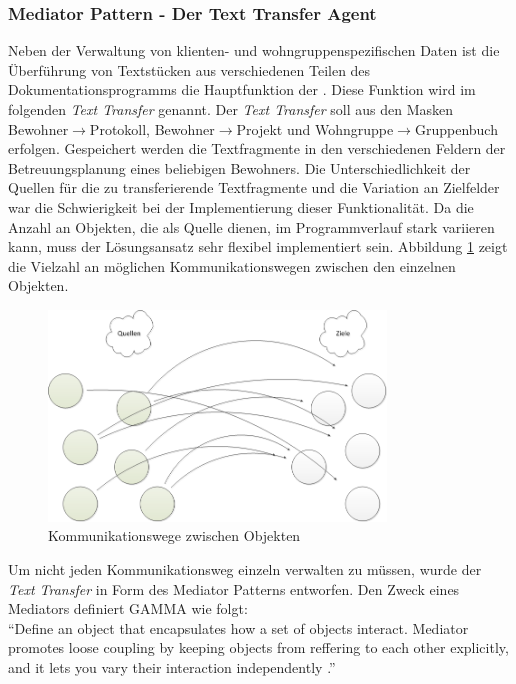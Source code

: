 \subsubsection{Mediator Pattern - Der Text Transfer Agent}
Neben der Verwaltung von klienten- und wohngruppenspezifischen Daten ist die Überführung von Textstücken aus verschiedenen Teilen des
Dokumentationsprogramms die Hauptfunktion der \EBP. Diese Funktion wird im folgenden \textit{Text Transfer} genannt. \newline
Der \textit{Text Transfer} soll aus den Masken Bewohner$\rightarrow$Protokoll, Bewohner$\rightarrow$Projekt und Wohngruppe$\rightarrow$Gruppenbuch
erfolgen. Gespeichert werden die Textfragmente in den verschiedenen Feldern der Betreuungsplanung eines beliebigen Bewohners. Die Unterschiedlichkeit
der Quellen für die zu transferierende Textfragmente und die Variation an Zielfelder war die Schwierigkeit bei der Implementierung dieser
Funktionalität. Da die Anzahl an Objekten, die als Quelle dienen, im Programmverlauf stark variieren kann, muss der Lösungsansatz sehr flexibel
implementiert sein. Abbildung \ref{unstrukturiert} zeigt die Vielzahl an möglichen Kommunikationswegen zwischen den einzelnen Objekten.\\
\begin{figure}[htp!]
	\includegraphics[width=0.8\textwidth]{unmediated}
	\caption{Kommunikationswege zwischen Objekten}
	\label{unstrukturiert}
\end{figure}
Um nicht jeden Kommunikationsweg einzeln verwalten zu müssen, wurde der \textit{Text Transfer} in Form des Mediator Patterns entworfen. Den Zweck
eines Mediators definiert GAMMA wie folgt: \\
``Define an object that encapsulates how a set of objects interact. Mediator promotes loose coupling by keeping objects from reffering to each other explicitly, 
and it lets you vary their interaction independently \cite[S. 273]{Entwurfsmuster}.''\\
